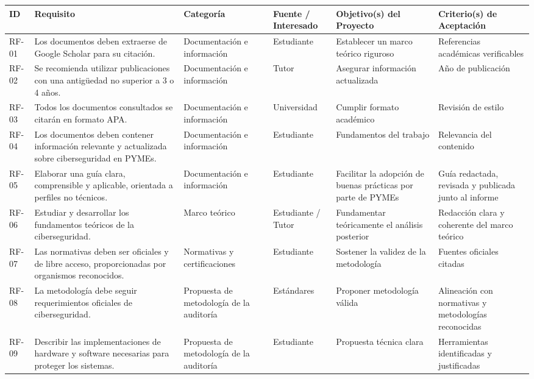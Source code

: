 \documentclass[a4paper, 11pt]{article}
\begin{document}
\begin{landscape}
\begin{table}
\centering
\small
\begin{tabular}{|p{1cm}|p{6cm}|p{2.5cm}|p{2.7cm}|p{3.2cm}|p{4.9cm}|}
\hline
\textbf{ID} & \textbf{Requisito} & \textbf{Categoría} & \textbf{Fuente / Interesado} & \textbf{Objetivo(s) del Proyecto} & \textbf{Criterio(s) de Aceptación} \\
\hline
RF-01 & Los documentos deben extraerse de Google Scholar para su citación. & Documentación e información & Estudiante & Establecer un marco teórico riguroso & Referencias académicas verificables \\
\hline
RF-02 & Se recomienda utilizar publicaciones con una antigüedad no superior a 3 o 4 años. & Documentación e información & Tutor & Asegurar información actualizada & Año de publicación \\
\hline
RF-03 & Todos los documentos consultados se citarán en formato APA. & Documentación e información & Universidad & Cumplir formato académico & Revisión de estilo \\
\hline
RF-04 & Los documentos deben contener información relevante y actualizada sobre ciberseguridad en PYMEs. & Documentación e información & Estudiante & Fundamentos del trabajo & Relevancia del contenido \\
\hline
RF-05 & Elaborar una guía clara, comprensible y aplicable, orientada a perfiles no técnicos. & Documentación e información & Estudiante & Facilitar la adopción de buenas prácticas por parte de PYMEs & Guía redactada, revisada y publicada junto al informe \\
\hline
RF-06 & Estudiar y desarrollar los fundamentos teóricos de la ciberseguridad. & Marco teórico & Estudiante / Tutor & Fundamentar teóricamente el análisis posterior & Redacción clara y coherente del marco teórico \\
\hline
RF-07 & Las normativas deben ser oficiales y de libre acceso, proporcionadas por organismos reconocidos. & Normativas y certificaciones & Estudiante & Sostener la validez de la metodología & Fuentes oficiales citadas \\
\hline
RF-08 & La metodología debe seguir requerimientos oficiales de ciberseguridad. & Propuesta de metodología de la auditoría & Estándares & Proponer metodología válida & Alineación con normativas y metodologías reconocidas \\
\hline
RF-09 & Describir las implementaciones de hardware y software necesarias para proteger los sistemas. & Propuesta de metodología de la auditoría & Estudiante & Propuesta técnica clara & Herramientas identificadas y justificadas \\

\end{tabular}
\end{table}
\end{landscape}
\end{document}
